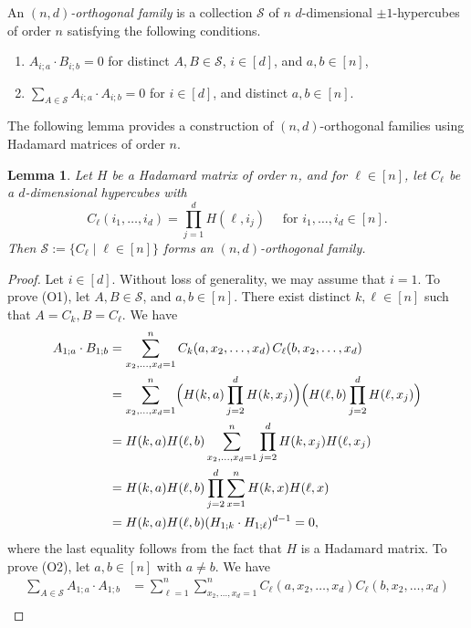 \documentclass[11pt,oneside]{amsart}
\newtheorem{lemma}[theorem]{Lemma}
\begin{document}
{An  {\it $(n,d)$-orthogonal family} is a  collection $\mathcal S$ of $n$ $d$-dimensional $\pm 1$-hypercubes of order $n$    satisfying the following conditions.
\begin{enumerate}
        \item [\textup{(O1)}]  $A_{i;a}\cdot B_{i;b}=0$ for  distinct $A,B\in \mathcal{S}$, $i\in [d]$, and  $a,b\in [n]$, 
        \item [\textup{(O2)}]  $\sum_{A\in \mathcal{S}} A_{i;a}\cdot A_{i;b}=0$ for $i\in [d]$, and distinct $a,b\in [n]$.
\end{enumerate}

The following lemma provides a construction of $(n,d)$-orthogonal families using Hadamard matrices of order $n$. 
\begin{lemma}\label{lem:constA}
  Let  $H$ be a Hadamard matrix of order $n$, and for $\ell\in [n]$, let $C_\ell$ be a $d$-dimensional hypercubes with
    $$C_\ell(i_1,\ldots, i_d)=\prod_{j=1}^d H(\ell,i_j) \quad \text{ for     } i_1,\ldots, i_d\in [n].$$ 
    Then $\mathcal{S}:=\{C_\ell \mid \ell\in [n]\}$ forms an $(n,d)$-orthogonal family. \end{lemma}
\begin{proof}
    Let $i\in [d]$. Without loss of generality, we may assume that $i=1$.
To prove (O1), let  $A,B\in \mathcal{S}$,  and  $a,b\in [n]$. There exist distinct $k,\ell\in [n]$ such that    $A=C_k, B=C_\ell$.  
    We have
    \begin{align*}
        A_{1;a}\cdot B_{1;b}&=\sum_{x_2,\ldots,x_d=1}^n C_k(a, x_2,\ldots, x_d)\, C_{\ell}(b, x_2,\ldots, x_d)\\
        &=\sum_{x_2,\ldots,x_d=1}^n \Bigl(H(k, a)\prod_{j=2}^{d} H(k, x_j)\Bigr) \Bigl(H(\ell, b)\prod_{j=2}^{d} H(\ell, x_j)\Bigr) \\
        &=H(k, a)H(\ell, b)\sum_{x_2,\ldots,x_d=1}^n \prod_{j=2}^{d} H(k, x_j) H(\ell, x_j)\\
        &=H(k, a)H(\ell, b) \prod_{j=2}^{d} \sum_{x=1}^n H(k, x)H(\ell, x)\\
        &=H(k, a)H(\ell, b) (H_{1;k} \cdot H_{1;\ell})^{d-1} =0,
    \end{align*}
    where the last equality follows from the fact that $H$ is a Hadamard matrix. To prove (O2), let $a,b\in [n]$ with $a\neq b$. We have
    \begin{align*}
    \sum_{A\in \mathcal{S}} A_{1;a}\cdot A_{1;b}&=\sum_{\ell=1}^n \sum_{x_2,\ldots,x_d=1}^n C_\ell(a,x_2,\ldots, x_d) C_{\ell}(b,x_2,\ldots, x_d)\\

\end{align*}
\end{proof}}
\end{document}
